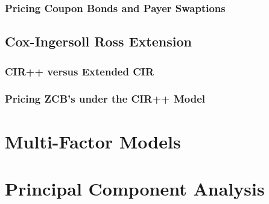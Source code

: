 \documentclass[a4paper,12pt]{scrartcl}
\begin{document}
\subsubsection{Pricing Coupon Bonds and Payer Swaptions}

\newpage
\subsection{Cox-Ingersoll Ross Extension}

\subsubsection{CIR++ versus Extended CIR}

\subsubsection{Pricing ZCB's under the CIR++ Model}


\newpage
\section{Multi-Factor Models}








\newpage
\appendix

\section{Principal Component Analysis}
\end{document}
